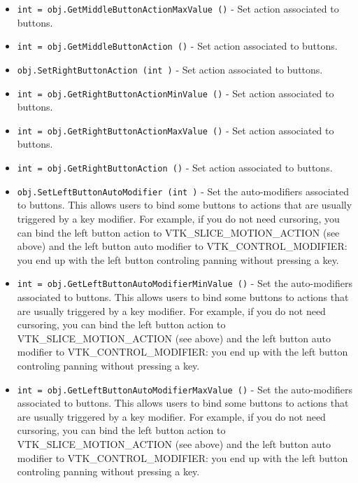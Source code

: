 \begin{itemize}
\item  \verb|int = obj.GetMiddleButtonActionMaxValue ()| -  Set action associated to buttons.

\item  \verb|int = obj.GetMiddleButtonAction ()| -  Set action associated to buttons.

\item  \verb|obj.SetRightButtonAction (int )| -  Set action associated to buttons.

\item  \verb|int = obj.GetRightButtonActionMinValue ()| -  Set action associated to buttons.

\item  \verb|int = obj.GetRightButtonActionMaxValue ()| -  Set action associated to buttons.

\item  \verb|int = obj.GetRightButtonAction ()| -  Set action associated to buttons.

\item  \verb|obj.SetLeftButtonAutoModifier (int )| -  Set the auto-modifiers associated to buttons.
 This allows users to bind some buttons to actions that are usually
 triggered by a key modifier. For example, if you do not need cursoring,
 you can bind the left button action to VTK\_SLICE\_MOTION\_ACTION (see above) 
 and the left button auto modifier to VTK\_CONTROL\_MODIFIER: you end up with
 the left button controling panning without pressing a key.

\item  \verb|int = obj.GetLeftButtonAutoModifierMinValue ()| -  Set the auto-modifiers associated to buttons.
 This allows users to bind some buttons to actions that are usually
 triggered by a key modifier. For example, if you do not need cursoring,
 you can bind the left button action to VTK\_SLICE\_MOTION\_ACTION (see above) 
 and the left button auto modifier to VTK\_CONTROL\_MODIFIER: you end up with
 the left button controling panning without pressing a key.

\item  \verb|int = obj.GetLeftButtonAutoModifierMaxValue ()| -  Set the auto-modifiers associated to buttons.
 This allows users to bind some buttons to actions that are usually
 triggered by a key modifier. For example, if you do not need cursoring,
 you can bind the left button action to VTK\_SLICE\_MOTION\_ACTION (see above) 
 and the left button auto modifier to VTK\_CONTROL\_MODIFIER: you end up with
 the left button controling panning without pressing a key.


\end{itemize}
